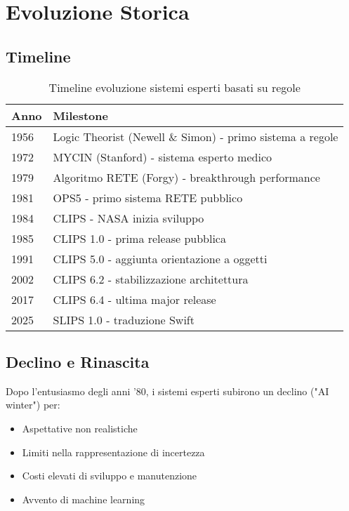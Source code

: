 \section{Evoluzione Storica}

\subsection{Timeline}

\begin{table}[h]
\centering
\small
\begin{tabular}{@{}ll@{}}
\toprule
\textbf{Anno} & \textbf{Milestone} \\
\midrule
1956 & Logic Theorist (Newell \& Simon) - primo sistema a regole \\
1972 & MYCIN (Stanford) - sistema esperto medico \\
1979 & Algoritmo RETE (Forgy) - breakthrough performance \\
1981 & OPS5 - primo sistema RETE pubblico \\
1984 & CLIPS - NASA inizia sviluppo \\
1985 & CLIPS 1.0 - prima release pubblica \\
1991 & CLIPS 5.0 - aggiunta orientazione a oggetti \\
2002 & CLIPS 6.2 - stabilizzazione architettura \\
2017 & CLIPS 6.4 - ultima major release \\
2025 & SLIPS 1.0 - traduzione Swift \\
\bottomrule
\end{tabular}
\caption{Timeline evoluzione sistemi esperti basati su regole}
\label{tab:timeline}
\end{table}

\subsection{Declino e Rinascita}

Dopo l'entusiasmo degli anni '80, i sistemi esperti subirono un declino ("AI winter") per:
\begin{itemize}
\item Aspettative non realistiche
\item Limiti nella rappresentazione di incertezza
\item Costi elevati di sviluppo e manutenzione
\item Avvento di machine learning
\end{itemize}

